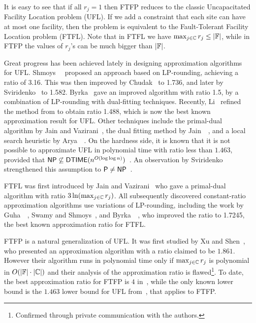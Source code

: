 \documentclass[11pt]{article}
\begin{document}
It is easy to see that if all $r_j=1$ then FTFP reduces to
the classic Uncapacitated Facility Location problem (UFL).
If we add a constraint that each site can have at most one
facility, then the problem is equivalent to the Fault-Tolerant Facility
Location problem (FTFL). Note that
in FTFL we have $\max_{j\in\mathbb{C}}r_j \leq |\mathbb{F}|$, 
while in FTFP the values of $r_j$'s can be much bigger than $|\mathbb{F}|$.

Great progress has been achieved lately in designing
approximation algorithms for UFL.
Shmoys~\etal~\cite{ShmoysTA97} proposed an approach based on
LP-rounding, achieving a ratio of 3.16.  This was then
improved by Chudak~\cite{ChudakS04} to 1.736, and later by
Sviridenko~\cite{Svi02} to 1.582.  Byrka~\cite{ByrkaA10}
gave an improved algorithm with ratio 1.5, by a combination of
LP-rounding with dual-fitting techniques.  Recently, Li~\cite{Li11} refined
the method from \cite{ByrkaA10} to obtain ratio 1.488, which is now
the best known approximation result for UFL. Other
techniques include the primal-dual algorithm by Jain and
Vazirani~\cite{JainV01}, the dual fitting method by
Jain~{\etal}~\cite{JainMMSV03}, and a local search heuristic
by Arya~{\etal}~\cite{AryaGKMMP04}.  On the hardness side,
it is known that it is not possible to approximate UFL in
polynomial time with ratio less than $1.463$, provided that
${\mbox{\sf NP}}\not\subseteq{\mbox{\sf DTIME}}(n^{O(\log\log
  n)})$~\cite{GuhaK98}. An observation by Sviridenko
strengthened this assumption to ${\mbox{\sf P}}\neq
{\mbox{\sf NP}}$~\cite{vygen05}.

FTFL was first introduced by Jain and
Vazirani~\cite{JainV03} who gave a primal-dual algorithm
with ratio $3\ln(\max_{j\in\mathbb{C}}r_j)$.  All
subsequently discovered constant-ratio approximation
algorithms use variations of LP-rounding, including the work
by Guha~{\etal}~\cite{GuhaMM01}, Swamy and
Shmoys~\cite{SwamyS08}, and Byrka~{\etal}~\cite{ByrkaSS10},
who improved the ratio to 1.7245, the best known
approximation ratio for FTFL.

FTFP is a natural generalization of UFL. It was first
studied by Xu and Shen~\cite{XuS09}, who presented an
approximation algorithm with a ratio claimed to be
$1.861$. However their algorithm runs in polynomial time
only if $\max_{j\in\mathbb{C}} r_j$ is polynomial in
$O(|\mathbb{F}|\cdot |\mathbb{C}|)$ and their analysis of the
approximation ratio is flawed\footnote{Confirmed through
  private communication with the authors.}.  To date, the
best approximation ratio for FTFP is $4$ in~\cite{YanC11}, 
while the only known lower bound is the $1.463$ lower bound for UFL
from~\cite{GuhaK98}, that applies to FTFP.
\end{document}
